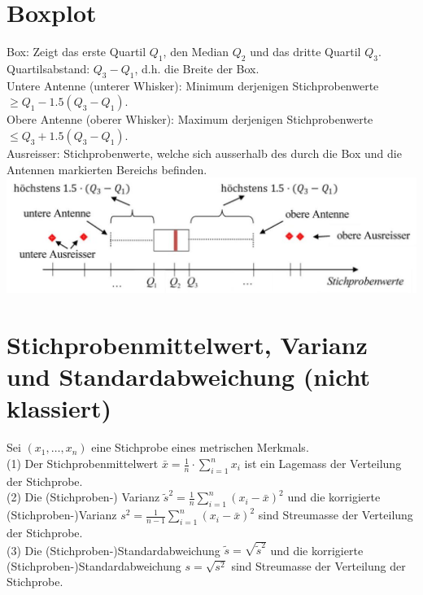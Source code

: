 \documentclass[10pt]{article}
\begin{document}
\section*{Boxplot}
Box: Zeigt das erste Quartil $Q_{1}$, den Median $Q_{2}$ und das dritte Quartil $Q_{3}$.\\
Quartilsabstand: $Q_{3}-Q_{1}$, d.h. die Breite der Box.\\
Untere Antenne (unterer Whisker): Minimum derjenigen Stichprobenwerte $\geq Q_{1}-1.5\left(Q_{3}-Q_{1}\right)$.\\
Obere Antenne (oberer Whisker): Maximum derjenigen Stichprobenwerte $\leq Q_{3}+1.5\left(Q_{3}-Q_{1}\right)$.\\
Ausreisser: Stichprobenwerte, welche sich ausserhalb des durch die Box und die Antennen markierten Bereichs befinden.\\
\includegraphics[width=\linewidth]{images/2025_01_02_7223f4748d9c61c6ce42g-4}

\section*{Stichprobenmittelwert, Varianz und Standardabweichung (nicht klassiert)}
Sei $\left(x_{1}, \ldots, x_{n}\right)$ eine Stichprobe eines metrischen Merkmals.\\
(1) Der Stichprobenmittelwert $\bar{x}=\frac{1}{n} \cdot \sum_{i=1}^{n} x_{i}$ ist ein Lagemass der Verteilung der Stichprobe.\\
(2) Die (Stichproben-) Varianz $\tilde{s}^{2}=\frac{1}{n} \sum_{i=1}^{n}\left(x_{i}-\bar{x}\right)^{2}$ und die korrigierte (Stichproben-)Varianz $s^{2}=\frac{1}{n-1} \sum_{i=1}^{n}\left(x_{i}-\bar{x}\right)^{2}$ sind Streumasse der Verteilung der Stichprobe.\\
(3) Die (Stichproben-)Standardabweichung $\tilde{s}=\sqrt{\tilde{s}^{2}}$ und die korrigierte (Stichproben-)Standardabweichung $s=\sqrt{s^{2}}$ sind Streumasse der Verteilung der Stichprobe.
\end{document}
